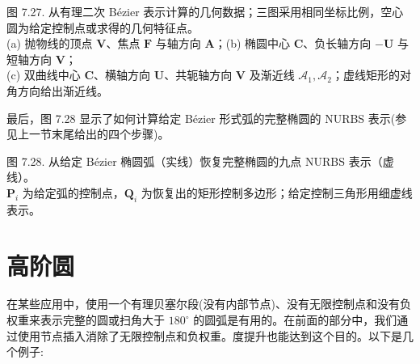 \documentclass[../main.tex]{subfiles}
\begin{document}
\begin{center}
\begin{minipage}{37cm}
\vspace*{.6\baselineskip}
\centering
\begin{minipage}[c]{13cm}\centering
{}
\end{minipage}\hfill
\begin{minipage}[c]{23cm}\centering
{}
\end{minipage}
\par\smallskip
图 7.27. 从有理二次 Bézier 表示计算的几何数据；三图采用相同坐标比例，空心圆为给定控制点或求得的几何特征点。\\
(a) 抛物线的顶点 $\mathbf V$、焦点 $\mathbf F$ 与轴方向 $\mathbf A$；(b) 椭圆中心 $\mathbf C$、负长轴方向 $-\mathbf U$ 与短轴方向 $\mathbf V$；\\
(c) 双曲线中心 $\mathbf C$、横轴方向 $\mathbf U$、共轭轴方向 $\mathbf V$ 及渐近线 $\mathcal A_1,\mathcal A_2$；虚线矩形的对角方向给出渐近线。
\end{minipage}
\end{center}

最后，图 7.28 显示了如何计算给定 Bézier 形式弧的完整椭圆的 NURBS 表示(参见上一节末尾给出的四个步骤)。






\begin{center}
\begin{minipage}{23cm}
\vspace*{.6\baselineskip}
\centering
{}
\par\smallskip
图 7.28. 从给定 Bézier 椭圆弧（实线）恢复完整椭圆的九点 NURBS 表示（虚线）。\\
$\mathbf P_i$ 为给定弧的控制点，$\mathbf Q_i$ 为恢复出的矩形控制多边形；给定控制三角形用细虚线表示。
\end{minipage}
\end{center}

\section{高阶圆}
在某些应用中，使用一个有理贝塞尔段(没有内部节点)、没有无限控制点和没有负权重来表示完整的圆或扫角大于 \({180}^{ \circ  }\) 的圆弧是有用的。在前面的部分中，我们通过使用节点插入消除了无限控制点和负权重。度提升也能达到这个目的。以下是几个例子:
\end{document}
